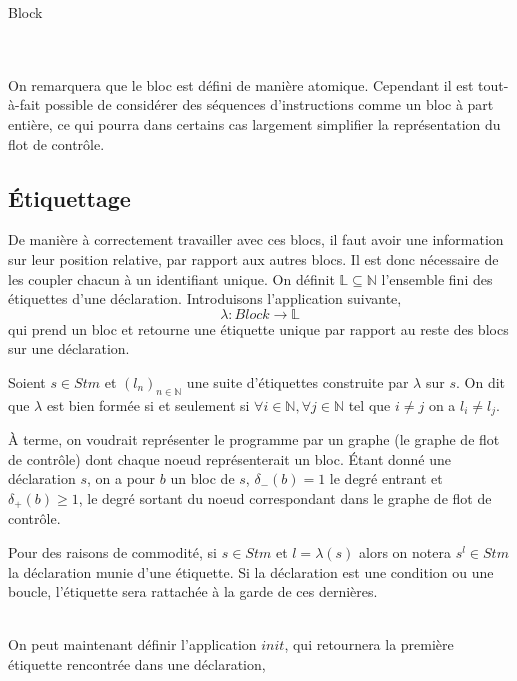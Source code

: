 \documentclass[a4paper, 10pt]{article}
\begin{document}
\begin{dtype}{Block}
	\\
	\\
	\akind{\sskip}\\
\end{dtype}

On remarquera que le bloc est défini de manière atomique. Cependant il est tout-à-fait possible de considérer des séquences
d'instructions comme un bloc à part entière, ce qui pourra dans certains cas largement simplifier la représentation du flot
de contrôle.

\subsection{Étiquettage}
De manière à correctement travailler avec ces blocs, il faut avoir une information sur leur position relative, par rapport
aux autres blocs. Il est donc nécessaire de les coupler chacun à un identifiant unique. 
On définit $\mathbb{L}\subseteq\mathbb{N}$ l'ensemble fini des étiquettes d'une déclaration. Introduisons l'application suivante,
\[
	\lambda: Block \longrightarrow \mathbb{L}
\]
\newline
qui prend un bloc et retourne une étiquette unique par rapport au reste des blocs sur une déclaration.
\newline
\newline
\begin{definition}
	Soient $s \in Stm$ et $(l_n)_{n\in\mathbb{N}}$ une suite d'étiquettes construite par $\lambda$ sur $s$.
	On dit que $\lambda$ est bien formée si et seulement si $\forall i \in \mathbb{N}, \forall j \in \mathbb{N}$ 
	tel que $i \neq j$ on a $l_i \neq l_j$.
\end{definition}
\newline
À terme, on voudrait représenter le programme par un graphe (le graphe de flot de contrôle) dont chaque noeud représenterait un bloc. 
Étant donné une déclaration $s$, on a pour  $b$ un bloc de $s$, $\delta_-(b) = 1$ le degré entrant et $\delta_+(b) \ge 1$, 
le degré sortant du noeud correspondant dans le graphe de flot de contrôle.
\\
\begin{notation}
	Pour des raisons de commodité, si $s \in Stm$ et $l = \lambda(s)$ alors on notera $s^l \in Stm$ la déclaration munie d'une étiquette.
	Si la déclaration est une condition ou une boucle, l'étiquette sera rattachée à la garde de ces dernières.
\end{notation}
\\
On peut maintenant définir l'application $init$, qui retournera la première étiquette rencontrée dans une déclaration,
\end{document}
